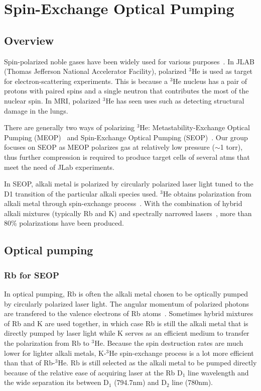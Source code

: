 \chapter{Spin-Exchange Optical Pumping}
\label{chap2}

\section{Overview}

Spin-polarized noble gases have been widely used for various purposes~\cite{PhysRevLett.71.959, PhysRevLett.89.242301, PhysRevLett.105.262302, PhysRevLett.107.072003}. In JLAB (Thomas Jefferson National Accelerator Facility), polarized $^{3}$He is used as target for electron-scattering experiments. This is because a $^{3}$He nucleus has a pair of protons with paired spins and a single neutron that contributes the most of the nuclear spin. In MRI, polarized $^{3}$He has seen uses such as detecting structural damage in the lungs.

There are generally two ways of polarizing $^{3}$He: Metastability-Exchange Optical Pumping (MEOP)~\cite{PhysRev.132.2561} and Spin-Exchange Optical Pumping (SEOP)~\cite{PhysRevC.36.2244, PhysRevA.44.3108, PhysRevLett.67.3219}. Our group focuses on SEOP as MEOP polarizes gas at relatively low pressure ($\sim$1 torr), thus further compression is required to produce target cells of several atms that meet the need of JLab experiments.

In SEOP, alkali metal is polarized by circularly polarized laser light tuned to the D1 transition of the particular alkali species used. $^{3}$He obtains polarization from alkali metal through spin-exchange process~\cite{PhysRevLett.5.373}. With the combination of hybrid alkali mixtures (typically Rb and K) and spectrally narrowed lasers~\cite{HapperPatent, PhysRevLett.91.123003}, more than 80\% polarizations have been produced.

\section{Optical pumping}

\subsection{Rb for SEOP}

In optical pumping, Rb is often the alkali metal chosen to be optically pumped by circularly polarized laser light. The angular momentum of polarized photons are transfered to the valence electrons of Rb atoms~\cite{WalkerHapper}. Sometimes hybrid mixtures of Rb and K are used together, in which case Rb is still the alkali metal that is directly pumped by laser light while K serves as an efficient medium to transfer the polarization from Rb to $^{3}$He. Because the spin destruction rates are much lower for lighter alkali metals, K-$^{3}$He spin-exchange process is a lot more efficient than that of Rb-$^{3}$He. Rb is still selected as the alkali metal to be pumped directly because of the relative ease of acquiring laser at the Rb D$_1$ line wavelength and the wide separation its between D$_1$ (794.7nm) and D$_2$ line (780nm).

